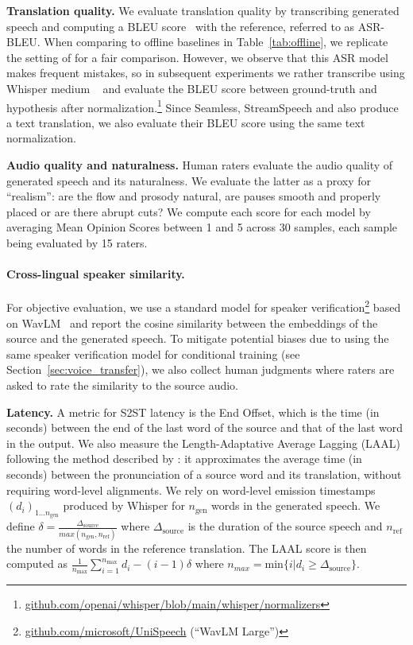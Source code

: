 \textbf{Translation quality.} We evaluate translation quality by transcribing generated speech and computing a BLEU score~\cite{sacrebleu} with the reference, referred to as ASR-BLEU. When comparing to offline baselines in Table~\ref{tab:offline}, we replicate the setting of \citet{streamspeech} for a fair comparison. However, we observe that this ASR model makes frequent mistakes, so in subsequent experiments we rather transcribe using Whisper medium
~\cite{whisper} and evaluate the BLEU score between ground-truth and hypothesis after normalization.\footnote{\href{https://github.com/openai/whisper/blob/main/whisper/normalizers/english.py}{github.com/openai/whisper/blob/main/whisper/normalizers}} Since Seamless, StreamSpeech and \ours also produce a text translation, we also evaluate their BLEU score using the same text normalization.


\textbf{Audio quality and naturalness.} Human raters evaluate the audio quality of generated speech and its naturalness. We evaluate the latter as a proxy for ``realism'': are the flow and prosody natural, are pauses smooth and properly placed or are there abrupt cuts? We compute each score for each model by averaging Mean Opinion Scores between 1 and 5 across 30 samples, each sample being evaluated by 15 raters.

\vspace{-1em}
\paragraph{Cross-lingual speaker similarity.} For objective evaluation, we use a standard model for speaker verification\footnote{\href{https://github.com/microsoft/UniSpeech/tree/main/downstreams/speaker\_verification\#pre-trained-models}{github.com/microsoft/UniSpeech} (``WavLM Large'')} based on WavLM~\cite{wavlm} and report the cosine similarity between the embeddings of the source and the generated speech. To mitigate potential biases due to using the same speaker verification model for conditional training (see Section~\ref{sec:voice_transfer}), we also collect human judgments where raters are asked to rate the similarity to the source audio.

\textbf{Latency.} A metric for S2ST latency is the End Offset, which is the time (in seconds) between the end of the last word of the source and that of the last word in the output. 
We also measure the Length-Adaptative Average Lagging (LAAL) following the method described by \citet{laal}: it approximates the average time (in seconds) between the pronunciation of a source word and its translation, without requiring word-level alignments. We rely on word-level emission timestamps $(d_i)_{1 \dots n_{\mathrm{gen}}}$ produced by Whisper for $n_{\mathrm{gen}}$ words in the generated speech. We define $\delta = \frac{\Delta_{\mathrm{source}}}{max(n_{\mathrm{gen}}, n_{\mathrm{ref}})}$ where $\Delta_{\mathrm{source}}$ is the duration of the source speech and $n_{\mathrm{ref}}$ the number of words in the reference translation. The LAAL score is then computed as $\frac{1}{n_{\mathrm{max}}}\sum_{i=1}^{n_{\mathrm{max}}} d_i - (i-1)\delta$ where $n_{max} = \mathrm{min}\{i|d_i \geq \Delta_{\mathrm{source}}\}$.


